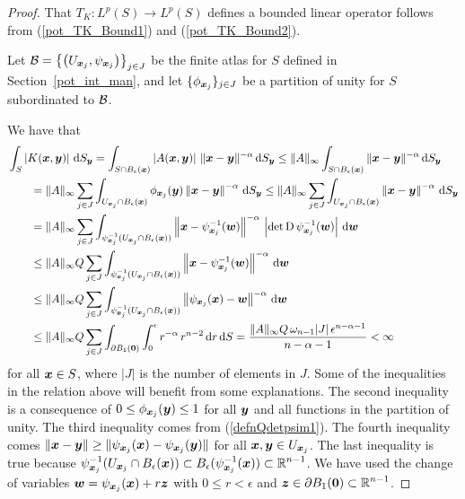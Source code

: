 \begin{proof}
That $\displaystyle T_K : L^p(S) \rightarrow L^p(S)$ defines a bounded linear
operator follows from (\ref{pot_TK_Bound1}) and (\ref{pot_TK_Bound2}).

Let $\displaystyle \mathcal{B}
= \left\{ \left(U_{{\bm{x}}_j}, \psi_{{\bm{x}}_j}\right) \right\}_{j\in J}$
be the finite atlas for $S$ defined in Section~\ref{pot_int_man}, and
let $\displaystyle \{ \phi_{{\bm{x}}_j} \}_{j\in J}$ be a partition of unity
for $S$ subordinated to $\mathcal{B}$.

We have that
\begin{align*}
&\int_S \left| K({\bm{x}},{\bm{y}}) \right| \,\mathrm{d}{S}_{{\bm{y}}}
= \int_{S\cap B_\epsilon({\bm{x}})} \left| A({\bm{x}},{\bm{y}}) \right| \,
\|{\bm{x}}-{\bm{y}}\|^{-\alpha} \,\mathrm{d}{S}_{{\bm{y}}}
\leq \|A\|_\infty
\int_{S\cap B_\epsilon({\bm{x}})} \|{\bm{x}}-{\bm{y}}\|^{-\alpha} \,\mathrm{d}{S}_{{\bm{y}}} \\ 
&\qquad = \|A\|_\infty \sum_{j\in J}
\int_{U_{{\bm{x}}_j}\cap B_\epsilon({\bm{x}})} \phi_{{\bm{x}}_j}({\bm{y}})
\left\|{\bm{x}} - {\bm{y}} \right\|^{-\alpha} \,\mathrm{d}{S}_{{\bm{y}}}
\leq \|A\|_\infty \sum_{j\in J} \int_{U_{{\bm{x}}_j}\cap B_\epsilon({\bm{x}})}
\left\|{\bm{x}} - {\bm{y}} \right\|^{-\alpha} \,\mathrm{d}{S}_{{\bm{y}}} \\
&\qquad = \|A\|_\infty \sum_{j\in J}
\int_{\psi_{{\bm{x}}_j}^{-1}(U_{{\bm{x}}_j}\cap B_\epsilon({\bm{x}}))}
\left\| {\bm{x}} - \psi_{{\bm{x}}_j}^{-1}({\bm{w}}) \right\|^{-\alpha}
\, \left|\det \operatorname{D} \psi_{{\bm{x}}_j}^{-1} ({\bm{w}}) \right| \,\mathrm{d}{{\bm{w}}} \\
&\qquad \leq \|A\|_\infty Q \sum_{j\in J}
\int_{\psi_{{\bm{x}}_j}^{-1}(U_{{\bm{x}}_j}\cap B_\epsilon({\bm{x}}))}
\left\| {\bm{x}} - \psi_{{\bm{x}}_j}^{-1}({\bm{w}}) \right\|^{-\alpha} \,\mathrm{d}{{\bm{w}}}
\\
&\qquad \leq \|A\|_\infty Q \sum_{j\in J}
\int_{\psi_{{\bm{x}}_j}^{-1}(U_{{\bm{x}}_j}\cap B_\epsilon({\bm{x}}))}
\left\| \psi_{{\bm{x}}_j}({\bm{x}}) - {\bm{w}} \right\|^{-\alpha} \,\mathrm{d}{{\bm{w}}} \\
&\qquad \leq \|A\|_\infty Q \sum_{j\in J} \int_{\partial B_1({\bm{0}})}
\int_0^{\epsilon} r^{-\alpha}\,r^{n-2} \,\mathrm{d}{r} \,\mathrm{d}{S}
= \frac{\|A\|_\infty Q\, \omega_{n-1} |J|\, \epsilon^{n-\alpha-1}}{n-\alpha-1}
< \infty
\end{align*}
for all ${\bm{x}} \in S$, where $|J|$ is the number of elements in $J$.
Some of the inequalities in the relation above will benefit from
some explanations.  The second inequality is a consequence of
$0 \leq \phi_{{\bm{x}}_j}({\bm{y}}) \leq 1$ for all
${\bm{y}}$ and all functions in the partition of unity.
The third inequality comes from (\ref{defnQdetpsim1}).  The fourth
inequality comes
$\displaystyle \|{\bm{x}}-{\bm{y}}\|
\geq \|\psi_{{\bm{x}}_j}({\bm{x}}) - \psi_{{\bm{x}}_j}({\bm{y}})\|$ for all
$\displaystyle {\bm{x}},{\bm{y}} \in U_{{\bm{x}}_j}$.
The last inequality is true because
$\displaystyle \psi_{{\bm{x}}_j}^{-1}(U_{{\bm{x}}_j}\cap B_\epsilon({\bm{x}}))
\subset B_\epsilon(\psi_{{\bm{x}}_j}^{-1}({\bm{x}})) \subset \mathbb{R}^{n-1}$.
We have used the change of
variables ${\bm{w}} = \psi_{{\bm{x}}_j}({\bm{x}}) + r {\bm{z}}$ with
$0 \leq r < \epsilon$ and
$\displaystyle {\bm{z}} \in \partial B_1({\bm{0}}) \subset \mathbb{R}^{n-1}$.


\end{proof}

